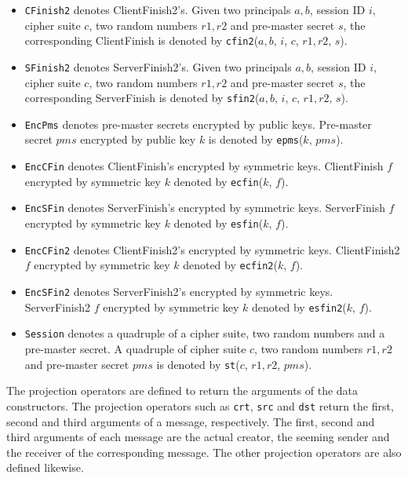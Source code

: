 \documentclass[a4paper,fleqn]{cas-dc}
\begin{document}
\begin{itemize}
\item \verb!CFinish2! denotes ClientFinish2’s. Given two principals $a, b$, session ID $i$, cipher suite $c$, two random numbers $r1, r2$ and pre-master secret $s$, the corresponding ClientFinish is denoted by \verb!cfin2!($a, b$, $i$, $c$, $r1, r2$, $s$).
\item \verb!SFinish2! denotes ServerFinish2’s. Given two principals $a, b$, session ID $i$, cipher suite $c$, two random numbers $r1, r2$ and pre-master secret $s$, the corresponding ServerFinish is denoted by \verb!sfin2!($a, b$, $i$, $c$, $r1, r2$, $s$).
\item \verb!EncPms! denotes pre-master secrets encrypted by public keys. Pre-master secret $pms$ encrypted by public key $k$ is denoted by \verb!epms!($k$, $pms$).
\item \verb!EncCFin! denotes ClientFinish’s encrypted by symmetric keys. ClientFinish $f$ encrypted by symmetric key $k$ denoted by \verb!ecfin!($k$, $f$).
\item \verb!EncSFin! denotes ServerFinish’s encrypted by symmetric keys. ServerFinish $f$ encrypted by symmetric key $k$ denoted by \verb!esfin!($k$, $f$).
\item \verb!EncCFin2! denotes ClientFinish2’s encrypted by symmetric keys. ClientFinish2 $f$ encrypted by symmetric key $k$ denoted by \verb!ecfin2!($k$, $f$).
\item \verb!EncSFin2! denotes ServerFinish2’s encrypted by symmetric keys. ServerFinish2 $f$ encrypted by symmetric key $k$ denoted by \verb!esfin2!($k$, $f$).
\item \verb!Session! denotes a quadruple of a cipher suite, two random numbers and a pre-master secret. A quadruple of cipher suite $c$, two random numbers $r1, r2$ and pre-master secret $pms$ is denoted by \verb!st!($c$, $r1, r2$, $pms$).
\end{itemize}

The projection operators are defined to return the arguments of the data constructors. The projection operators such as \verb!crt!, \verb!src! and \verb!dst! return the first, second and third arguments of a message, respectively. The first, second and  third  arguments  of  each  message are  the  actual creator,  the  seeming  sender  and  the  receiver  of the  corresponding message. The other projection operators 
are also defined likewise.

\end{document}
